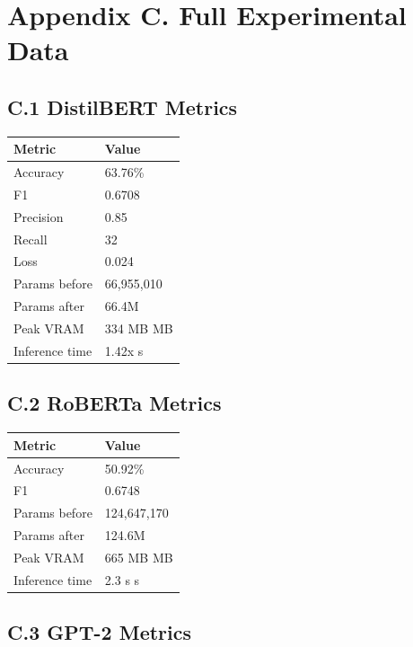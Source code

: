 
\section{Appendix C. Full Experimental Data}

\subsection{C.1 DistilBERT Metrics}

\begin{table}[H]
\centering
\small
\begin{tabular}{ll}
\toprule
\textbf{Metric} & \textbf{Value} \\
\midrule
Accuracy & 63.76\% \\
F1 & 0.6708 \\
Precision & 0.85 \\
Recall & 32 \\
Loss & 0.024 \\
Params before & 66,955,010 \\
Params after & 66.4M \\
Peak VRAM & 334 MB MB \\
Inference time & 1.42x s \\
\bottomrule
\end{tabular}
\end{table}

\subsection{C.2 RoBERTa Metrics}

\begin{table}[H]
\centering
\small
\begin{tabular}{ll}
\toprule
\textbf{Metric} & \textbf{Value} \\
\midrule
Accuracy & 50.92\% \\
F1 & 0.6748 \\
Params before & 124,647,170 \\
Params after & 124.6M \\
Peak VRAM & 665 MB MB \\
Inference time & 2.3 s s \\
\bottomrule
\end{tabular}
\end{table}

\subsection{C.3 GPT-2 Metrics}

